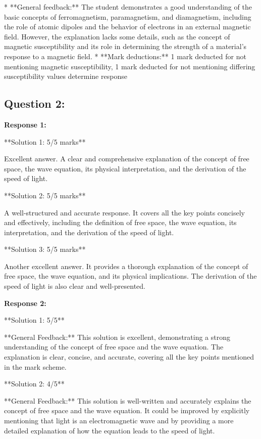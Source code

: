 \documentclass[a4paper,11pt]{article}
\begin{document}
* **General feedback:** The student demonstrates a good understanding of the basic concepts of ferromagnetism, paramagnetism, and diamagnetism, including the role of atomic dipoles and the behavior of electrons in an external magnetic field. However, the explanation lacks some details, such as the concept of magnetic susceptibility and its role in determining the strength of a material's response to a magnetic field.
* **Mark deductions:** 1 mark deducted for not mentioning magnetic susceptibility, 1 mark deducted for not mentioning differing susceptibility values determine response 



\subsection*{Question 2:}

\textbf{Response 1:}

**Solution 1: 5/5 marks**

Excellent answer. A clear and comprehensive explanation of the concept of free space, the wave equation, its physical interpretation, and the derivation of the speed of light.

**Solution 2: 5/5 marks**

A well-structured and accurate response. It covers all the key points concisely and effectively, including the definition of free space, the wave equation, its interpretation, and the derivation of the speed of light.

**Solution 3: 5/5 marks**

Another excellent answer. It provides a thorough explanation of the concept of free space, the wave equation, and its physical implications. The derivation of the speed of light is also clear and well-presented.

\textbf{Response 2:}

**Solution 1: 5/5**

**General Feedback:** This solution is excellent, demonstrating a strong understanding of the concept of free space and the wave equation. The explanation is clear, concise, and accurate, covering all the key points mentioned in the mark scheme.

**Solution 2: 4/5**

**General Feedback:** This solution is well-written and accurately explains the concept of free space and the wave equation. It could be improved by explicitly mentioning that light is an electromagnetic wave and by providing a more detailed explanation of how the equation leads to the speed of light.
\end{document}
